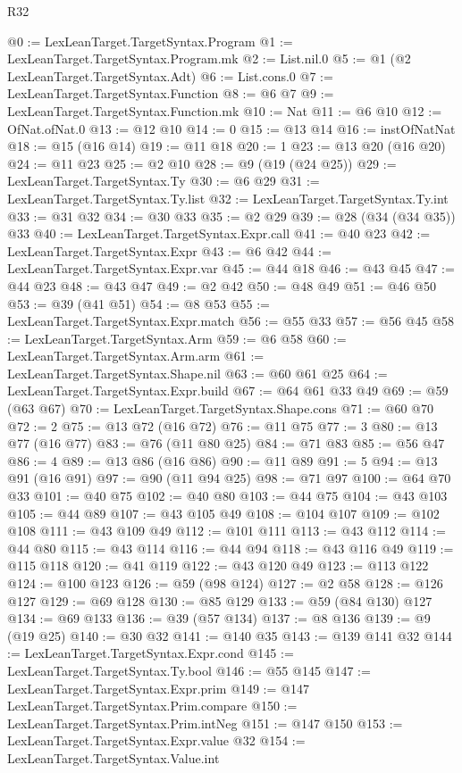 \begin{lexlean}{R32}
\begin{coremodule}
@0 := LexLeanTarget.TargetSyntax.Program
@1 := LexLeanTarget.TargetSyntax.Program.mk
@2 := List.nil.{0}
@5 := @1 (@2 LexLeanTarget.TargetSyntax.Adt)
@6 := List.cons.{0}
@7 := LexLeanTarget.TargetSyntax.Function
@8 := @6 @7
@9 := LexLeanTarget.TargetSyntax.Function.mk
@10 := Nat
@11 := @6 @10
@12 := OfNat.ofNat.{0}
@13 := @12 @10
@14 := 0
@15 := @13 @14
@16 := instOfNatNat
@18 := @15 (@16 @14)
@19 := @11 @18
@20 := 1
@23 := @13 @20 (@16 @20)
@24 := @11 @23
@25 := @2 @10
@28 := @9 (@19 (@24 @25))
@29 := LexLeanTarget.TargetSyntax.Ty
@30 := @6 @29
@31 := LexLeanTarget.TargetSyntax.Ty.list
@32 := LexLeanTarget.TargetSyntax.Ty.int
@33 := @31 @32
@34 := @30 @33
@35 := @2 @29
@39 := @28 (@34 (@34 @35)) @33
@40 := LexLeanTarget.TargetSyntax.Expr.call
@41 := @40 @23
@42 := LexLeanTarget.TargetSyntax.Expr
@43 := @6 @42
@44 := LexLeanTarget.TargetSyntax.Expr.var
@45 := @44 @18
@46 := @43 @45
@47 := @44 @23
@48 := @43 @47
@49 := @2 @42
@50 := @48 @49
@51 := @46 @50
@53 := @39 (@41 @51)
@54 := @8 @53
@55 := LexLeanTarget.TargetSyntax.Expr.match
@56 := @55 @33
@57 := @56 @45
@58 := LexLeanTarget.TargetSyntax.Arm
@59 := @6 @58
@60 := LexLeanTarget.TargetSyntax.Arm.arm
@61 := LexLeanTarget.TargetSyntax.Shape.nil
@63 := @60 @61 @25
@64 := LexLeanTarget.TargetSyntax.Expr.build
@67 := @64 @61 @33 @49
@69 := @59 (@63 @67)
@70 := LexLeanTarget.TargetSyntax.Shape.cons
@71 := @60 @70
@72 := 2
@75 := @13 @72 (@16 @72)
@76 := @11 @75
@77 := 3
@80 := @13 @77 (@16 @77)
@83 := @76 (@11 @80 @25)
@84 := @71 @83
@85 := @56 @47
@86 := 4
@89 := @13 @86 (@16 @86)
@90 := @11 @89
@91 := 5
@94 := @13 @91 (@16 @91)
@97 := @90 (@11 @94 @25)
@98 := @71 @97
@100 := @64 @70 @33
@101 := @40 @75
@102 := @40 @80
@103 := @44 @75
@104 := @43 @103
@105 := @44 @89
@107 := @43 @105 @49
@108 := @104 @107
@109 := @102 @108
@111 := @43 @109 @49
@112 := @101 @111
@113 := @43 @112
@114 := @44 @80
@115 := @43 @114
@116 := @44 @94
@118 := @43 @116 @49
@119 := @115 @118
@120 := @41 @119
@122 := @43 @120 @49
@123 := @113 @122
@124 := @100 @123
@126 := @59 (@98 @124)
@127 := @2 @58
@128 := @126 @127
@129 := @69 @128
@130 := @85 @129
@133 := @59 (@84 @130) @127
@134 := @69 @133
@136 := @39 (@57 @134)
@137 := @8 @136
@139 := @9 (@19 @25)
@140 := @30 @32
@141 := @140 @35
@143 := @139 @141 @32
@144 := LexLeanTarget.TargetSyntax.Expr.cond
@145 := LexLeanTarget.TargetSyntax.Ty.bool
@146 := @55 @145
@147 := LexLeanTarget.TargetSyntax.Expr.prim
@149 := @147 LexLeanTarget.TargetSyntax.Prim.compare
@150 := LexLeanTarget.TargetSyntax.Prim.intNeg
@151 := @147 @150
@153 := LexLeanTarget.TargetSyntax.Expr.value @32
@154 := LexLeanTarget.TargetSyntax.Value.int

\end{coremodule}
\end{lexlean}
